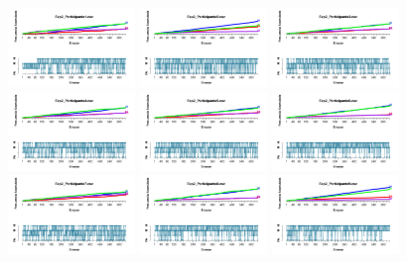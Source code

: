 \documentclass[a4paper ]{article}
\begin{document}
\begin{figure}[th]
\centering
\includegraphics[width=0.3\textwidth]{Figures/Outcome_Exp2_P1} \includegraphics[width=0.3\textwidth]{Figures/Outcome_Exp2_P2} \includegraphics[width=0.3\textwidth]{Figures/Outcome_Exp2_P3}
\includegraphics[width=0.3\textwidth]{Figures/Outcome_Exp2_P4} \includegraphics[width=0.3\textwidth]{Figures/Outcome_Exp2_P5} \includegraphics[width=0.3\textwidth]{Figures/Outcome_Exp2_P6}
\includegraphics[width=0.3\textwidth]{Figures/Outcome_Exp2_P7} \includegraphics[width=0.3\textwidth]{Figures/Outcome_Exp2_P8} \includegraphics[width=0.3\textwidth]{Figures/Outcome_Exp2_P9}

\end{figure}
\end{document}
